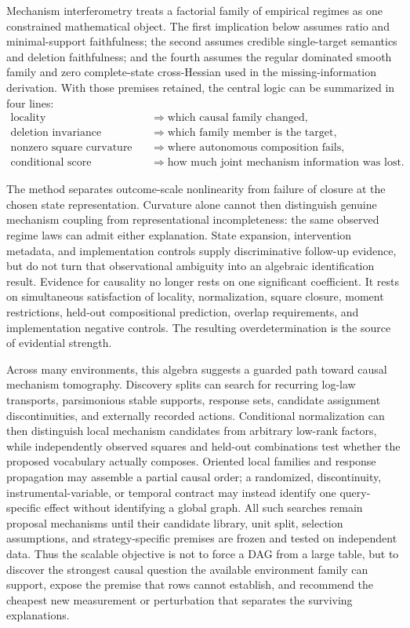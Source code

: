 \documentclass[11pt]{article}
\begin{document}
Mechanism interferometry treats a factorial family of empirical regimes as one constrained mathematical object.  The first implication below assumes ratio and minimal-support faithfulness; the second assumes credible single-target semantics and deletion faithfulness; and the fourth assumes the regular dominated smooth family and zero complete-state cross-Hessian used in the missing-information derivation.  With those premises retained, the central logic can be summarized in four lines:
\begin{align}
\text{locality}
&\Longrightarrow
\text{which causal family changed},\\
\text{deletion invariance}
&\Longrightarrow
\text{which family member is the target},\\
\text{nonzero square curvature}
&\Longrightarrow
\text{where autonomous composition fails},\\
\text{conditional score covariance}
&\Longrightarrow
\text{how much joint mechanism information was lost}.
\end{align}

The method separates outcome-scale nonlinearity from failure of closure at the chosen state representation.  Curvature alone cannot then distinguish genuine mechanism coupling from representational incompleteness: the same observed regime laws can admit either explanation.  State expansion, intervention metadata, and implementation controls supply discriminative follow-up evidence, but do not turn that observational ambiguity into an algebraic identification result.  Evidence for causality no longer rests on one significant coefficient.  It rests on simultaneous satisfaction of locality, normalization, square closure, moment restrictions, held-out compositional prediction, overlap requirements, and implementation negative controls.  The resulting overdetermination is the source of evidential strength.

Across many environments, this algebra suggests a guarded path toward causal mechanism tomography.  Discovery splits can search for recurring log-law transports, parsimonious stable supports, response sets, candidate assignment discontinuities, and externally recorded actions.  Conditional normalization can then distinguish local mechanism candidates from arbitrary low-rank factors, while independently observed squares and held-out combinations test whether the proposed vocabulary actually composes.  Oriented local families and response propagation may assemble a partial causal order; a randomized, discontinuity, instrumental-variable, or temporal contract may instead identify one query-specific effect without identifying a global graph.  All such searches remain proposal mechanisms until their candidate library, unit split, selection assumptions, and strategy-specific premises are frozen and tested on independent data.  Thus the scalable objective is not to force a DAG from a large table, but to discover the strongest causal question the available environment family can support, expose the premise that rows cannot establish, and recommend the cheapest new measurement or perturbation that separates the surviving explanations.
\end{document}
